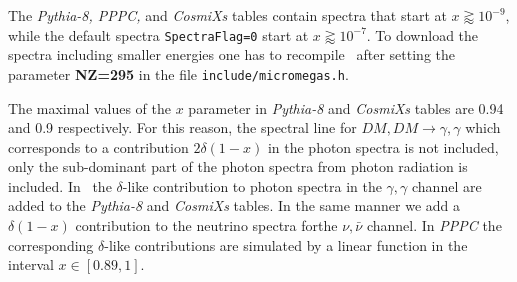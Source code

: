 \documentclass[12pt,a4paper]{article}
\begin{document}
The { \it Pythia-8, PPPC,} and {\it CosmiXs} tables contain spectra that start at  $x \gtrapprox 10^{-9}$, while the default spectra {\tt SpectraFlag=0} start at  $x \gtrapprox 10^{-7}$. To download  the  spectra including  smaller energies one has 
to recompile \micro\ after setting the  parameter  {\bf NZ=295}  in the  file {\tt include/micromegas.h}. 

The maximal values of the $x$ parameter  in  { \it Pythia-8} and {\it CosmiXs} tables are  0.94 and 0.9 respectively. For this reason,  the  spectral line 
for  $DM,DM\to \gamma,\gamma$  which corresponds to a contribution  $2 \delta(1-x)$ in the photon spectra is not included, only the sub-dominant part of the photon spectra from photon radiation is included. 
In \micro\, the  $\delta$-like contribution to photon spectra in the 
$ \gamma,\gamma$ channel are added to the { \it Pythia-8} and {\it CosmiXs} tables. In the same manner we add a $\delta(1-x) $ contribution to the neutrino spectra forthe  $\nu,\bar{\nu}$ channel. In {\it PPPC } the   corresponding $\delta$-like contributions are simulated by  a linear function in the  interval 
$x\in[0.89,1]$. 
\end{document}
